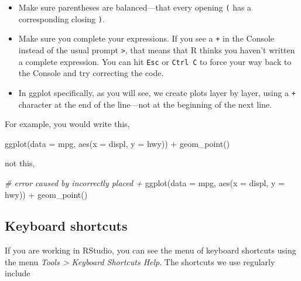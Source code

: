 \documentclass[
]{book}
\newenvironment{Shaded}{\begin{snugshade}}{\end{snugshade}}
\newcommand{\AttributeTok}[1]{\textcolor[rgb]{0.77,0.63,0.00}{#1}}
\newcommand{\CommentTok}[1]{\textcolor[rgb]{0.56,0.35,0.01}{\textit{#1}}}
\newcommand{\FunctionTok}[1]{\textcolor[rgb]{0.00,0.00,0.00}{#1}}
\newcommand{\NormalTok}[1]{#1}
\newcommand{\SpecialCharTok}[1]{\textcolor[rgb]{0.00,0.00,0.00}{#1}}
\providecommand{\tightlist}{%
  \setlength{\itemsep}{0pt}\setlength{\parskip}{0pt}}
\begin{document}
\begin{itemize}
\tightlist
\item
  Make sure parentheses are balanced---that every opening \texttt{(} has a corresponding closing \texttt{)}.\\
\item
  Make sure you complete your expressions. If you see a \texttt{+} in the Console instead of the usual prompt \texttt{\textgreater{}}, that means that R thinks you haven't written a complete expression. You can hit \texttt{Esc} or \texttt{Ctrl\ C} to force your way back to the Console and try correcting the code.\\
\item
  In ggplot specifically, as you will see, we create plots layer by layer, using a \texttt{+} character at the end of the line---not at the beginning of the next line.
\end{itemize}

For example, you would write this,

\begin{Shaded}
\begin{Highlighting}[]
\FunctionTok{ggplot}\NormalTok{(}\AttributeTok{data =}\NormalTok{ mpg, }\FunctionTok{aes}\NormalTok{(}\AttributeTok{x =}\NormalTok{ displ, }\AttributeTok{y =}\NormalTok{ hwy)) }\SpecialCharTok{+}
    \FunctionTok{geom\_point}\NormalTok{()}
\end{Highlighting}
\end{Shaded}

not this,

\begin{Shaded}
\begin{Highlighting}[]
\CommentTok{\# error caused by incorrectly placed +}
\FunctionTok{ggplot}\NormalTok{(}\AttributeTok{data =}\NormalTok{ mpg, }\FunctionTok{aes}\NormalTok{(}\AttributeTok{x =}\NormalTok{ displ, }\AttributeTok{y =}\NormalTok{ hwy))  }
    \SpecialCharTok{+} \FunctionTok{geom\_point}\NormalTok{()}
\end{Highlighting}
\end{Shaded}

\hypertarget{keyboard-shortcuts}{%
\subsection{Keyboard shortcuts}\label{keyboard-shortcuts}}

If you are working in RStudio, you can see the menu of keyboard
shortcuts using the menu \emph{Tools \textgreater{} Keyboard Shortcuts Help}. The
shortcuts we use regularly include
\end{document}
